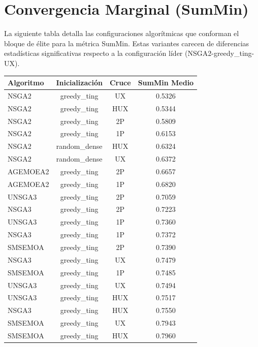\section{Convergencia Marginal (SumMin)}\label{anexo:elite_summin}

La siguiente tabla detalla las configuraciones algorítmicas que conforman el bloque de élite para la métrica SumMin. Estas variantes carecen de diferencias estadísticas significativas respecto a la configuración líder (NSGA2-greedy\_ting-UX).

\begin{table}[H]
    \centering
    \begin{tabular}{lccc}
        \toprule
        \textbf{Algoritmo} & \textbf{Inicialización} & \textbf{Cruce} & \textbf{SumMin Medio} \\
        \midrule
        NSGA2 & greedy\_ting & UX & 0.5326 \\
        NSGA2 & greedy\_ting & HUX & 0.5344 \\
        NSGA2 & greedy\_ting & 2P & 0.5809 \\
        NSGA2 & greedy\_ting & 1P & 0.6153 \\
        NSGA2 & random\_dense & HUX & 0.6324 \\
        NSGA2 & random\_dense & UX & 0.6372 \\
        AGEMOEA2 & greedy\_ting & 2P & 0.6657 \\
        AGEMOEA2 & greedy\_ting & 1P & 0.6820 \\
        UNSGA3 & greedy\_ting & 2P & 0.7059 \\
        NSGA3 & greedy\_ting & 2P & 0.7223 \\
        UNSGA3 & greedy\_ting & 1P & 0.7360 \\
        NSGA3 & greedy\_ting & 1P & 0.7372 \\
        SMSEMOA & greedy\_ting & 2P & 0.7390 \\
        NSGA3 & greedy\_ting & UX & 0.7479 \\
        SMSEMOA & greedy\_ting & 1P & 0.7485 \\
        UNSGA3 & greedy\_ting & UX & 0.7494 \\
        UNSGA3 & greedy\_ting & HUX & 0.7517 \\
        NSGA3 & greedy\_ting & HUX & 0.7550 \\
        SMSEMOA & greedy\_ting & UX & 0.7943 \\
        SMSEMOA & greedy\_ting & HUX & 0.7960 \\

\end{tabular}
\end{table}
